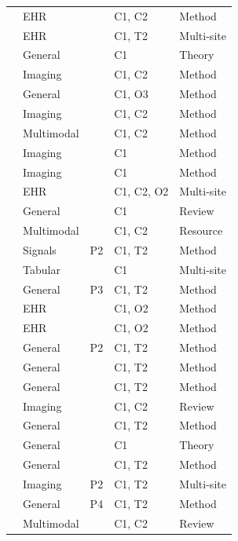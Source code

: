 {\begin{longtable}{@{}p{5.6cm}llll@{}}
\citet{choudhury2019differential} & EHR &  & C1, C2 & Method\\
\citet{huang2019patient} & EHR &  & C1, T2 & Multi-site\\
\citet{jordan2019communication} & General &  & C1 & Theory\\
\citet{li2019privacy} & Imaging &  & C1, C2 & Method\\
\citet{mohri2019agnostic} & General &  & C1, O3 & Method\\
\citet{poirot2019split} & Imaging &  & C1, C2 & Method\\
\citet{raisaro2019medco} & Multimodal &  & C1, C2 & Method\\
\citet{roy2019braintorrent} & Imaging &  & C1 & Method\\
\citet{sheller2019multi} & Imaging &  & C1 & Method\\
\citet{suchard2019comprehensive} & EHR &  & C1, C2, O2 & Multi-site\\
\citet{yang2019federated} & General &  & C1 & Review\\
\citet{beyan2020distributed} & Multimodal &  & C1, C2 & Resource\\
\citet{chen2020fedhealth} & Signals & P2 & C1, T2 & Method\\
\citet{deist2020distributed} & Tabular &  & C1 & Multi-site\\
\citet{tdinh2020personalized} & General & P3 & C1, T2 & Method\\
\citet{duan2020learninglocal} & EHR &  & C1, O2 & Method\\
\citet{duan2020learning} & EHR &  & C1, O2 & Method\\
\citet{fallah2020personalized} & General & P2 & C1, T2 & Method\\
\citet{ghosh2020efficient} & General &  & C1, T2 & Method\\
\citet{hsieh2020non} & General &  & C1, T2 & Method\\
\citet{kaissis2020secure} & Imaging &  & C1, C2 & Review\\
\citet{karimireddy2020scaffold} & General &  & C1, T2 & Method\\
\citet{koloskova2020unified} & General &  & C1 & Theory\\
\citet{li2020federated} & General &  & C1, T2 & Method\\
\citet{li2020multi} & Imaging & P2 & C1, T2 & Multi-site\\
\citet{lin2020ensemble} & General & P4 & C1, T2 & Method\\
\citet{rieke2020future} & Multimodal &  & C1, C2 & Review\\

\end{longtable}}
